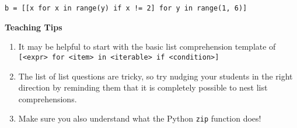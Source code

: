 \begin{blocksection}
\begin{parts}
\begin{solution}[0.25in]
\begin{lstlisting}
b = [[x for x in range(y) if x != 2] for y in range(1, 6)]
\end{lstlisting}
\end{solution}
\end{parts}
\begin{questionmeta}
    \textbf{Teaching Tips}
    \begin{enumerate}
            \item It may be helpful to start with the basic list comprehension template of \texttt{[<expr> for <item> in <iterable> if <condition>]}
            \item The list of list questions are tricky, so try nudging your students in the right direction by reminding them that it is completely possible to nest list comprehensions.
            \item Make sure you also understand what the Python \texttt{zip} function does!
    \end{enumerate}
\end{questionmeta}
\end{blocksection}
